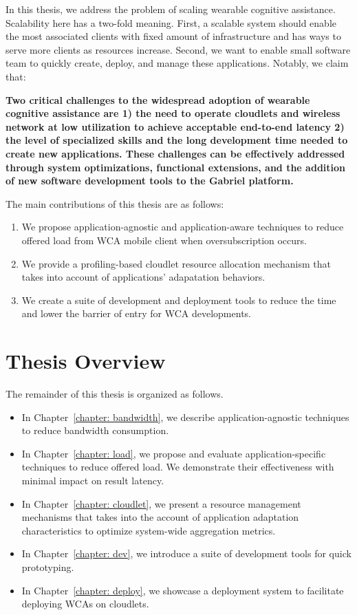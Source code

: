 In this thesis, we address the problem of scaling wearable cognitive assistance.
Scalability here has a two-fold meaning. First, a scalable system should enable
the most associated clients with fixed amount of infrastructure and has ways to
serve more clients as resources increase. Second, we want to enable small
software team to quickly create, deploy, and manage these applications. 
Notably, we claim that:

\textbf{Two critical challenges to the widespread adoption of wearable cognitive
  assistance are 1) the need to operate cloudlets and wireless network at low
  utilization to achieve acceptable end-to-end latency 2) the level of specialized
  skills and the long development time needed to create new applications. These
  challenges can be effectively addressed through system optimizations,
  functional extensions, and the addition of new software development tools to
  the Gabriel platform.}


The main contributions of this thesis are as follows:
\begin{enumerate}
  \item{We propose application-agnostic and application-aware techniques 
  to reduce offered load from WCA mobile client when oversubscription occurs.}
  \item{We provide a profiling-based cloudlet resource allocation mechanism that
  takes into account 
  of applications' adapatation behaviors.}
  \item{We create a suite of development and deployment tools to reduce the time
  and lower the barrier of entry for WCA developments.}
\end{enumerate}

\section{Thesis Overview}

The remainder of this thesis is organized as follows.

\begin{itemize}
  \item{In Chapter~\ref{chapter: bandwidth}, we describe application-agnostic techniques to reduce bandwidth consumption.}
  \item{In Chapter~\ref{chapter: load}, we propose and evaluate 
  application-specific techniques to reduce offered load. 
  We demonstrate their effectiveness 
  with minimal impact on result latency.}
  \item{In Chapter~\ref{chapter: cloudlet}, 
  we present a resource management mechanisms that takes into the account of
  application adaptation characteristics to optimize system-wide aggregation
  metrics.}
  \item{In Chapter~\ref{chapter: dev}, 
  we introduce a suite of development tools for quick prototyping.
  }
  \item{In Chapter~\ref{chapter: deploy}, 
  we showcase a deployment system to facilitate 
  deploying WCAs on cloudlets.}
\end{itemize}